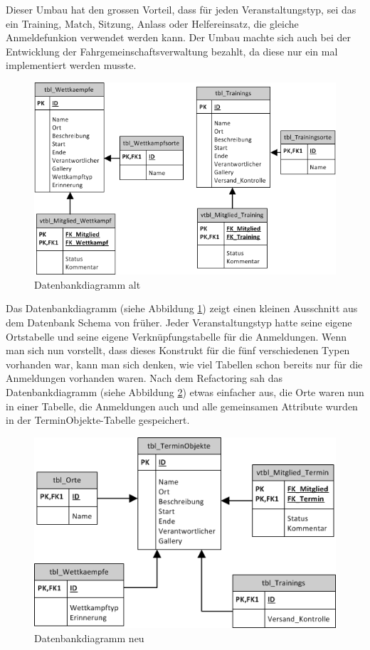Dieser Umbau hat den grossen Vorteil, dass für jeden Veranstaltungstyp, sei das ein Training, Match, Sitzung, Anlass oder Helfereinsatz, die gleiche Anmeldefunkion verwendet werden kann. Der Umbau machte sich auch bei der Entwicklung der Fahrgemeinschaftsverwaltung bezahlt, da diese nur ein mal implementiert werden musste.\\

\begin{figure}[h]
\centering
\includegraphics[scale=0.5]{images/visio/datenbankdiagramm_alt.png}
\caption{Datenbankdiagramm alt}
\label{fig:db_schema_alt}
\end{figure}

Das Datenbankdiagramm (siehe Abbildung \ref{fig:db_schema_alt}) zeigt einen kleinen Ausschnitt aus dem Datenbank Schema von früher. Jeder Veranstaltungstyp hatte seine eigene Ortstabelle und seine eigene Verknüpfungstabelle für die Anmeldungen. Wenn man sich nun vorstellt, dass dieses Konstrukt für die fünf verschiedenen Typen vorhanden war, kann man sich denken, wie viel Tabellen schon bereits nur für die Anmeldungen vorhanden waren. Nach dem Refactoring sah das Datenbankdiagramm (siehe Abbildung \ref{fig:db_schema_neu}) etwas einfacher aus, die Orte waren nun in einer Tabelle, die Anmeldungen auch und alle gemeinsamen Attribute wurden in der TerminObjekte-Tabelle gespeichert.

\begin{figure}[h]
\centering
\includegraphics[scale=0.5]{images/visio/datenbankdiagramm_neu.png}
\caption{Datenbankdiagramm neu}
\label{fig:db_schema_neu}
\end{figure}

